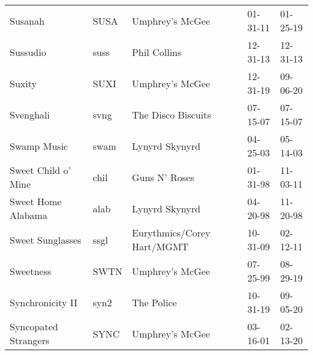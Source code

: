 \begin{longtable}{p{}p{}p{}p{}p{}}
                                                                 Susanah &          SUSA &                                          Umphrey's McGee &              01-31-11 &             01-25-19 \\
                                                                Sussudio &          suss &                                             Phil Collins &              12-31-13 &             12-31-13 \\
                                                                  Suxity &          SUXI &                                          Umphrey's McGee &              12-31-19 &             09-06-20 \\
                                                               Svenghali &          svng &                                       The Disco Biscuits &              07-15-07 &             07-15-07 \\
                                                             Swamp Music &          swam &                                           Lynyrd Skynyrd &              04-25-03 &             05-14-03 \\
                                                     Sweet Child o' Mine &          chil &                                            Guns N' Roses &              01-31-98 &             11-03-11 \\
                                                      Sweet Home Alabama &          alab &                                           Lynyrd Skynyrd &              04-20-98 &             11-20-98 \\
                                                        Sweet Sunglasses &          ssgl &                               Eurythmics/Corey Hart/MGMT &              10-31-09 &             02-12-11 \\
                                                               Sweetness &          SWTN &                                          Umphrey's McGee &              07-25-99 &             08-29-19 \\
                                                        Synchronicity II &          syn2 &                                               The Police &              10-31-19 &             09-05-20 \\
                                                    Syncopated Strangers &          SYNC &                                          Umphrey's McGee &              03-16-01 &             02-13-20 \\

\end{longtable}
